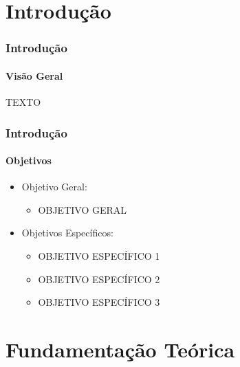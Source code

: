 \section{Introdução}

\begin{frame}
    \frametitle{Introdução}
    \framesubtitle{Visão Geral}
    \center

        TEXTO
        
\end{frame}


\begin{frame}
    \frametitle{Introdução}
    \framesubtitle{Objetivos}
    \begin{itemize}
        
        \item Objetivo Geral:
        \begin{itemize}
        
            \item OBJETIVO GERAL

        \end{itemize}
        
        \item Objetivos Específicos:
        \begin{itemize}

            \item OBJETIVO ESPECÍFICO 1
            \item OBJETIVO ESPECÍFICO 2
            \item OBJETIVO ESPECÍFICO 3

        \end{itemize}
        
    \end{itemize}
\end{frame}

\section{Fundamentação Teórica}

